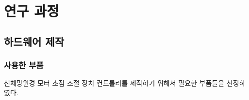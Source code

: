 \section{연구 과정}

\subsection{하드웨어 제작}

\subsubsection{사용한 부품}


천체망원경 모터 초점 조절 장치 컨트롤러를 제작하기 위해서 필요한 부품들을 선정하였다. 

